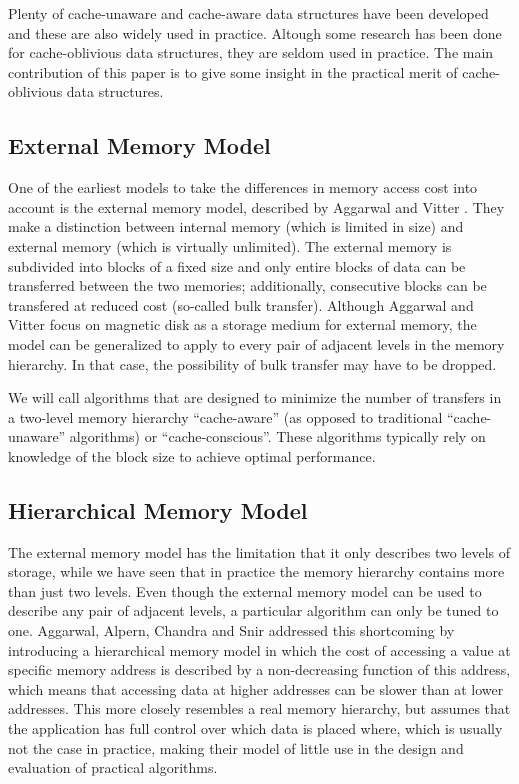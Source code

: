 \documentclass{acm_proc_article-sp}
\begin{document}
Plenty of cache-unaware and cache-aware data structures have been developed and these are also widely used in practice. Altough some research has been done for cache-oblivious data structures, they are seldom used in practice. The main contribution of this paper is to give some insight in the practical merit of cache-oblivious data structures.

\subsection{External Memory Model}
One of the earliest models to take the differences in memory access cost into account is the external memory model, described by Aggarwal and Vitter \cite{aggarwal1988ioc}. They make a distinction between internal memory (which is limited in size) and external memory (which is virtually unlimited). The external memory is subdivided into blocks of a fixed size and only entire blocks of data can be transferred between the two memories; additionally, consecutive blocks can be transfered at reduced cost (so-called bulk transfer). Although Aggarwal and Vitter focus on magnetic disk as a storage medium for external memory, the model can be generalized to apply to every pair of adjacent levels in the memory hierarchy. In that case, the possibility of bulk transfer may have to be dropped.

We will call algorithms that are designed to minimize the number of transfers in a two-level memory hierarchy ``cache-aware'' (as opposed to traditional ``cache-unaware'' algorithms) or ``cache-conscious''. These algorithms typically rely on knowledge of the block size to achieve optimal performance.

\subsection{Hierarchical Memory Model}
The external memory model has the limitation that it only describes two levels of storage, while we have seen that in practice the memory hierarchy contains more than just two levels. Even though the external memory model can be used to describe any pair of adjacent levels, a particular algorithm can only be tuned to one. Aggarwal, Alpern, Chandra and Snir \cite{aggarwal1987mhm} addressed this shortcoming by introducing a hierarchical memory model in which the cost of accessing a value at specific memory address is described by a non-decreasing function of this address, which means that accessing data at higher addresses can be slower than at lower addresses. This more closely resembles a real memory hierarchy, but assumes that the application has full control over which data is placed where, which is usually not the case in practice, making their model of little use in the design and evaluation of practical algorithms.
\end{document}
